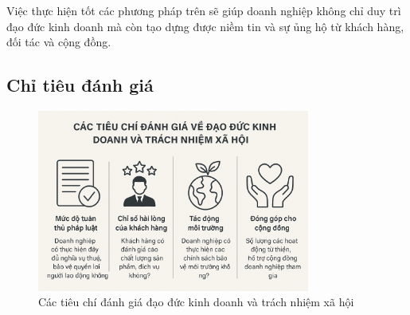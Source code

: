 \documentclass{article}
\begin{document}
    \vspace{0.2cm}
    Việc thực hiện tốt các phương pháp trên sẽ giúp doanh nghiệp không chỉ duy trì đạo đức kinh doanh mà còn tạo dựng được niềm tin và sự ủng hộ từ khách hàng, đối tác và cộng đồng.

\subsection{Chỉ tiêu đánh giá}
    \begin{figure}[H]
        \centering
        \includegraphics[width=0.8\textwidth]{assert/img3.png}
        \caption{Các tiêu chí đánh giá đạo đức kinh doanh và trách nhiệm xã hội}
        \label{fig:img3}
    \end{figure}
\end{document}
